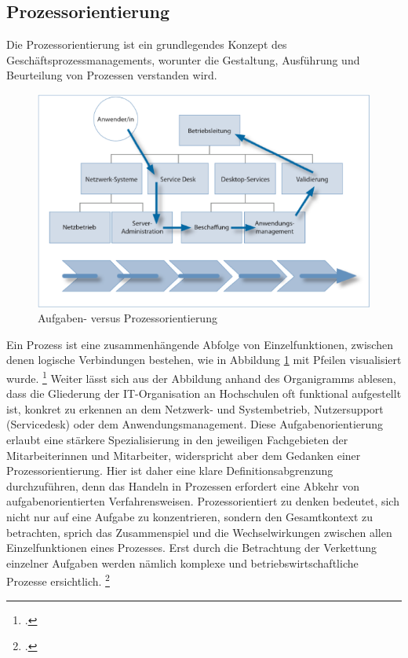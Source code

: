 \subsection{Prozessorientierung}
\label{subsection_prozessorientierung}
Die Prozessorientierung ist ein grundlegendes Konzept des Geschäftsprozessmanagements, worunter 
die Gestaltung, Ausführung und Beurteilung von Prozessen verstanden wird.
\begin{figure}[h!]
	\centering
	\includegraphics[width=15cm]{kapitel/gruppe1_2/bilder/aufgaben-versus_prozessorientierung} 
	\caption{Aufgaben- versus Prozessorientierung\protect\footnotemark}
	\label{fig_aufgaben_vs_prozess}
\end{figure}
Ein Prozess ist eine 
zusammenhängende Abfolge von Einzelfunktionen, zwischen denen logische Verbindungen bestehen, 
wie in Abbildung \ref{fig_aufgaben_vs_prozess} mit Pfeilen visualisiert wurde. 
\footcite[Vgl.][60]{krcmar_einfuhrung_2015} Weiter lässt sich aus der Abbildung anhand des 
Organigramms ablesen, dass die Gliederung der IT-Organisation an Hochschulen oft funktional 
aufgestellt ist, konkret zu erkennen an dem Netzwerk- und Systembetrieb, Nutzersupport (Servicedesk) 
oder dem Anwendungsmanagement. Diese Aufgabenorientierung erlaubt eine stärkere Spezialisierung 
in den jeweiligen Fachgebieten der Mitarbeiterinnen und Mitarbeiter, widerspricht aber dem Gedanken 
einer Prozessorientierung. Hier ist daher eine klare Definitionsabgrenzung durchzuführen, denn das 
Handeln in Prozessen erfordert eine Abkehr von aufgabenorientierten Verfahrensweisen. 
Prozessorientiert zu denken bedeutet, sich nicht nur auf eine Aufgabe zu konzentrieren, sondern den 
Gesamtkontext zu betrachten, sprich das Zusammenspiel und die Wechselwirkungen zwischen allen 
Einzelfunktionen eines Prozesses. Erst durch die Betrachtung der Verkettung einzelner Aufgaben 
werden nämlich komplexe und betriebswirtschaftliche Prozesse ersichtlich. 
\footcite[Vgl.][274]{heinrich_stelzer_2011}

